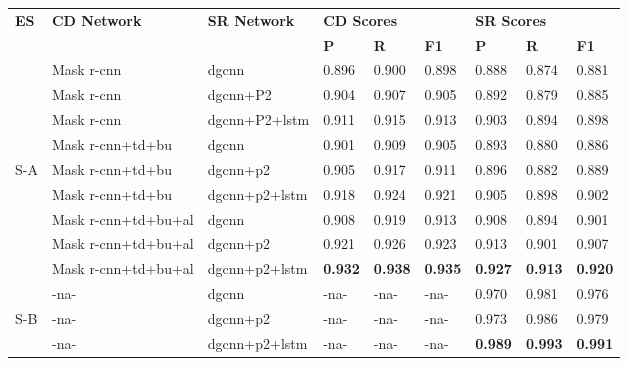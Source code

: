 \documentclass[runningheads]{llncs}
\begin{document}
\begin{table}
\vspace{-1em}
\end{table}

\begin{table}\addtolength{\tabcolsep}{-1.0pt}
\begin{center}
\begin{tabular}{|l|l |l |l l l| l l l|} \hline
\textbf{ES} &\textbf{CD Network} & \textbf{SR Network} &\multicolumn{3}{l|}{\textbf{CD Scores}} &\multicolumn{3}{l|}{\textbf{SR Scores}} \\ \cline{4-9}
 &  &   &\textbf{P} &\textbf{R} &\textbf{F1} &\textbf{P} &\textbf{R} &\textbf{F1} \\ \hline
&Mask {\sc r-cnn} &{\sc dgcnn} &0.896 &0.900 &0.898	&0.888 &0.874 &0.881 \\
&Mask {\sc r-cnn} &{\sc dgcnn}+P2 &0.904 &0.907	&0.905 &0.892 &0.879 &0.885 \\
&Mask {\sc r-cnn} &{\sc dgcnn}+P2+{\sc lstm} &0.911	&0.915 &0.913 &0.903 &0.894	&0.898 \\ \cline{2-9}
&Mask {\sc r-cnn}+{\sc td}+{\sc bu} &{\sc dgcnn} &0.901	&0.909 &0.905 &0.893 &0.880	&0.886 \\
S-A &Mask {\sc r-cnn}+{\sc td}+{\sc bu} &{\sc dgcnn}+{\sc p}2 &0.905 &0.917 &0.911 &0.896 &0.882 &0.889 \\ 
&Mask {\sc r-cnn}+{\sc td}+{\sc bu}	&{\sc dgcnn}+{\sc p}2+{\sc lstm} &0.918	&0.924 &0.921 &0.905 &0.898	&0.902 \\ \cline{2-9}
&Mask {\sc r-cnn}+{\sc td}+{\sc bu}+{\sc al} &{\sc dgcnn} &0.908 &0.919	&0.913 &0.908 &0.894 &0.901 \\	
&Mask {\sc r-cnn}+{\sc td}+{\sc bu}+{\sc al} &{\sc dgcnn}+{\sc p}2 &0.921 &0.926 &0.923	&0.913 &0.901 &0.907 \\
&Mask {\sc r-cnn}+{\sc td}+{\sc bu}+{\sc al} &{\sc dgcnn}+{\sc p}2+{\sc lstm} &\textbf{0.932} &\textbf{0.938}	&\textbf{0.935}	&\textbf{0.927}	&\textbf{0.913}	&\textbf{0.920} \\ \hline
 & -{\sc na}- &{\sc dgcnn} & -{\sc na}- & -{\sc na}-  & -{\sc na}- &0.970 &0.981 &0.976 \\ 
S-B & -{\sc na}- &{\sc dgcnn}+{\sc p}2  & -{\sc na}- & -{\sc na}- & -{\sc na}- &0.973 &0.986 &0.979 \\
  & -{\sc na}-  &{\sc dgcnn}+{\sc p}2+{\sc lstm} & -{\sc na}- & -{\sc na}- & -{\sc na}- &\textbf{0.989}	&\textbf{0.993}	&\textbf{0.991} \\ \hline 
\end{tabular}
\end{center}

\end{table}
\end{document}
